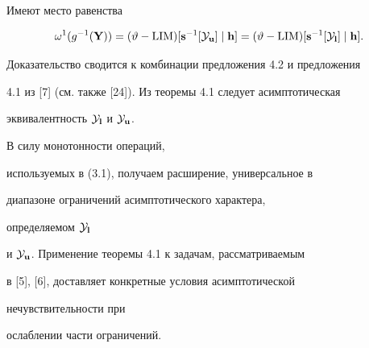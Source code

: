 \begin{pf}
[{{\Bbb N}_{{\tau}_{\bold l}}}[{\bold Y}]] ]$;


с учетом предложения 4.1 имеем


\begin{equation}


{g^{-1}}({\bold Y}) = ({t_{\bold l}} - {\LIM})


[{{\bold s}^{-1}}[{\cal Y}_{\bold l}]


\mid {\bold m}].


\end{equation}


Комбинируя (4.9), (4.10), получаем требуемое свойство.


\end{pf}





\begin{thms}


Имеют место равенства


$$


{{\omega}^1}({g^{-1}}({\bold Y})) = (\vt - {\LIM})[{{\bold s}^{-1}}[{\cal


Y}_{\bold u}] \mid {\bold h}] = (\vt - {\LIM})


[{{\bold s}^{-1}}[{\cal Y}_{\bold


l}] \mid {\bold h}].


$$


\end{thms}





Доказательство сводится к комбинации предложения 4.2 и предложения


4.1 из [7] (см. также [24]). Из теоремы 4.1 следует асимптотическая


эквивалентность ${\cal Y}_{\bold l}$ и ${\cal Y}_{\bold u}$.


В силу монотонности операций,


используемых в (3.1), получаем расширение, универсальное в


диапазоне ограничений асимптотического характера,


определяемом ${\cal Y}_{\bold l}$


и ${\cal Y}_{\bold u}$. Применение теоремы 4.1 к задачам, рассматриваемым


в [5], [6], доставляет конкретные условия асимптотической


нечувствительности при


ослаблении части ограничений.





